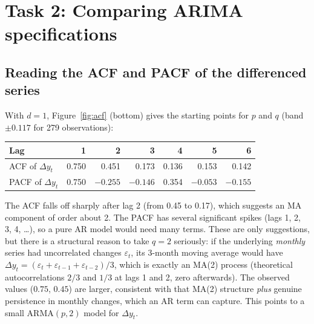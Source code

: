 \documentclass[11pt,a4paper]{article}
\begin{document}
\section{Task 2: Comparing ARIMA specifications}
\subsection{Reading the ACF and PACF of the differenced series}\label{sec:acfpacf}
With $d=1$, Figure~\ref{fig:acf} (bottom) gives the starting points for $p$ and $q$ (band $\pm 0.117$ for 279 observations):
\begin{center}\small
\begin{tabular}{lrrrrrr}\toprule
Lag & 1 & 2 & 3 & 4 & 5 & 6\\\midrule
ACF of $\Delta y_t$ & 0.750 & 0.451 & 0.173 & 0.136 & 0.153 & 0.142\\
PACF of $\Delta y_t$ & 0.750 & $-0.255$ & $-0.146$ & 0.354 & $-0.053$ & $-0.155$\\\bottomrule
\end{tabular}
\end{center}
The ACF falls off sharply after lag 2 (from 0.45 to 0.17), which suggests an MA component of order about 2. The PACF has several significant spikes (lags 1, 2, 3, 4, \dots), so a pure AR model would need many terms. These are only suggestions, but there is a structural reason to take $q=2$ seriously: if the underlying \emph{monthly} series had uncorrelated changes $\varepsilon_t$, its 3-month moving average would have $\Delta y_t=(\varepsilon_t+\varepsilon_{t-1}+\varepsilon_{t-2})/3$, which is exactly an MA(2) process (theoretical autocorrelations $2/3$ and $1/3$ at lags 1 and 2, zero afterwards). The observed values ($0.75$, $0.45$) are larger, consistent with that MA(2) structure \emph{plus} genuine persistence in monthly changes, which an AR term can capture. This points to a small ARMA$(p,2)$ model for $\Delta y_t$.
\end{document}
